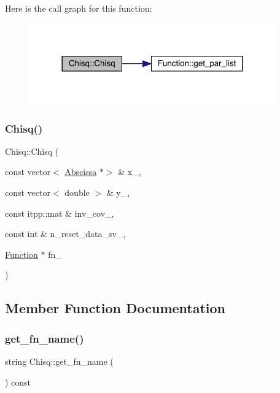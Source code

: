 Here is the call graph for this function\+:
\nopagebreak
\begin{figure}[H]
\begin{center}
\leavevmode
\includegraphics[width=300pt]{dd/da9/classChisq_a625fc6e1e3ffc8faa123f2f50f54a22b_cgraph}
\end{center}
\end{figure}
\mbox{\label{classChisq_a625fc6e1e3ffc8faa123f2f50f54a22b}} 
\subsubsection{\texorpdfstring{Chisq()}{Chisq()}\hspace{0.1cm}{\footnotesize\ttfamily [2/2]}}
{\footnotesize\ttfamily Chisq\+::\+Chisq (\begin{DoxyParamCaption}\item[{const vector$<$ \mbox{\hyperlink{classAbscissa}{Abscissa}} $\ast$$>$ \&}]{x\+\_\+,  }\item[{const vector$<$ double $>$ \&}]{y\+\_\+,  }\item[{const itpp\+::mat \&}]{inv\+\_\+cov\+\_\+,  }\item[{const int \&}]{n\+\_\+reset\+\_\+data\+\_\+sv\+\_\+,  }\item[{\mbox{\hyperlink{classFunction}{Function}} $\ast$}]{fn\+\_\+ }\end{DoxyParamCaption})}



\subsection{Member Function Documentation}
\mbox{\label{classChisq_a43f74965844bd0b1aa8a323e973728e6}} 
\subsubsection{\texorpdfstring{get\_fn\_name()}{get\_fn\_name()}\hspace{0.1cm}{\footnotesize\ttfamily [1/2]}}
{\footnotesize\ttfamily string Chisq\+::get\+\_\+fn\+\_\+name (\begin{DoxyParamCaption}{ }\end{DoxyParamCaption}) const\hspace{0.3cm}{\ttfamily [inline]}}

